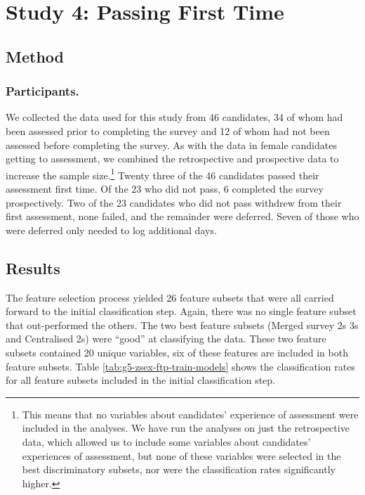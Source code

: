 \documentclass[
  12pt,
  a4paper,
]{book}
\begin{document}
\hypertarget{ftp}{%
\section{Study 4: Passing First Time}\label{ftp}}

\hypertarget{ftp-method}{%
\subsection{Method}\label{ftp-method}}

\hypertarget{ftp-participants}{%
\subsubsection{Participants.}\label{ftp-participants}}

We collected the data used for this study from 46 candidates, 34 of whom had been assessed prior to completing the survey and 12 of whom had not been assessed before completing the survey. As with the data in female candidates getting to assessment, we combined the retrospective and prospective data to increase the sample size.\footnote{This means that no variables about candidates' experience of assessment were included in the analyses. We have run the analyses on just the retrospective data, which allowed us to include some variables about candidates' experiences of assessment, but none of these variables were selected in the best discriminatory subsets, nor were the classification rates significantly higher.} Twenty three of the 46 candidates passed their assessment first time. Of the 23 who did not pass, 6 completed the survey prospectively. Two of the 23 candidates who did not pass withdrew from their first assessment, none failed, and the remainder were deferred. Seven of those who were deferred only needed to log additional days.

\hypertarget{ftp-results}{%
\subsection{Results}\label{ftp-results}}

The feature selection process yielded 26 feature subsets that were all carried forward to the initial classification step. Again, there was no single feature subset that out-performed the others. The two best feature subsets (Merged survey 2s 3s and Centralised 2s) were ``good'' at classifying the data. These two feature subsets contained 20 unique variables, six of these features are included in both feature subsets. Table \ref{tab:g5-zsex-ftp-train-models} shows the classification rates for all feature subsets included in the initial classification step.
\end{document}
